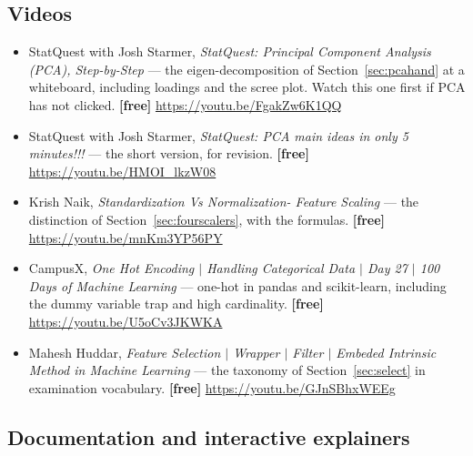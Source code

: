 \documentclass[11pt]{article}
\begin{document}
\subsection*{Videos}

\begin{itemize}[leftmargin=*]
  \item StatQuest with Josh Starmer, \emph{StatQuest: Principal Component
    Analysis (PCA), Step-by-Step} --- the eigen-decomposition of
    Section~\ref{sec:pcahand} at a whiteboard, including loadings and the
    scree plot. Watch this one first if PCA has not clicked. \textbf{[free]}
    \url{https://youtu.be/FgakZw6K1QQ}
  \item StatQuest with Josh Starmer, \emph{StatQuest: PCA main ideas in only 5
    minutes!!!} --- the short version, for revision. \textbf{[free]}
    \url{https://youtu.be/HMOI_lkzW08}
  \item Krish Naik, \emph{Standardization Vs Normalization- Feature Scaling}
    --- the distinction of Section~\ref{sec:fourscalers}, with the formulas.
    \textbf{[free]} \url{https://youtu.be/mnKm3YP56PY}
  \item CampusX, \emph{One Hot Encoding $\vert$ Handling Categorical Data
    $\vert$ Day 27 $\vert$ 100 Days of Machine Learning} --- one-hot in pandas
    and scikit-learn, including the dummy variable trap and high cardinality.
    \textbf{[free]} \url{https://youtu.be/U5oCv3JKWKA}
  \item Mahesh Huddar, \emph{Feature Selection $\vert$ Wrapper $\vert$ Filter
    $\vert$ Embeded Intrinsic Method in Machine Learning} --- the taxonomy of
    Section~\ref{sec:select} in examination vocabulary. \textbf{[free]}
    \url{https://youtu.be/GJnSBhxWEEg}
\end{itemize}

\subsection*{Documentation and interactive explainers}
\end{document}
